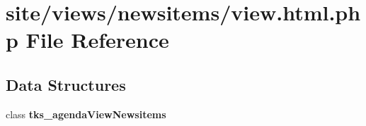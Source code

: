 \section{site/views/newsitems/view.html.\+php File Reference}
\label{site_2views_2newsitems_2view_8html_8php}
\subsection*{Data Structures}
\begin{DoxyCompactItemize}
\item 
class \textbf{ tks\+\_\+agenda\+View\+Newsitems}
\end{DoxyCompactItemize}
